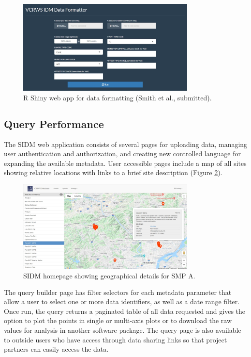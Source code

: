 \begin{figure}[ht]
	\centering
	\includegraphics[width=0.8\textwidth]{gfx/chapter-storage/data-formatter.jpeg}
	\caption[R Shiny web app for data formatting.]{R Shiny web app for data formatting (Smith et al., submitted).}
	\label{fig:data-formatter}
\end{figure}




\subsection{Query Performance}

The SIDM web application consists of several pages for uploading data, managing user authentication and authorization, and creating new controlled language for expanding the available metadata.
User accessible pages include a map of all sites showing relative locations with links to a brief site description (Figure \ref{fig:idm-homepage}).

\begin{figure}[ht]
	\centering
	\includegraphics[width=0.8\textwidth]{gfx/chapter-storage/idm-homepage.jpeg}
	\caption{SIDM homepage showing geographical details for SMP A.}
	\label{fig:idm-homepage}
\end{figure}

The query builder page has filter selectors for each metadata parameter that allow a user to select one or more data identifiers, as well as a date range filter.
Once run, the query returns a paginated table of all data requested and gives the option to plot the points in single or multi-axis plots or to download the raw values for analysis in another software package.
The query page is also available to outside users who have access through data sharing links so that project partners can easily access the data.

